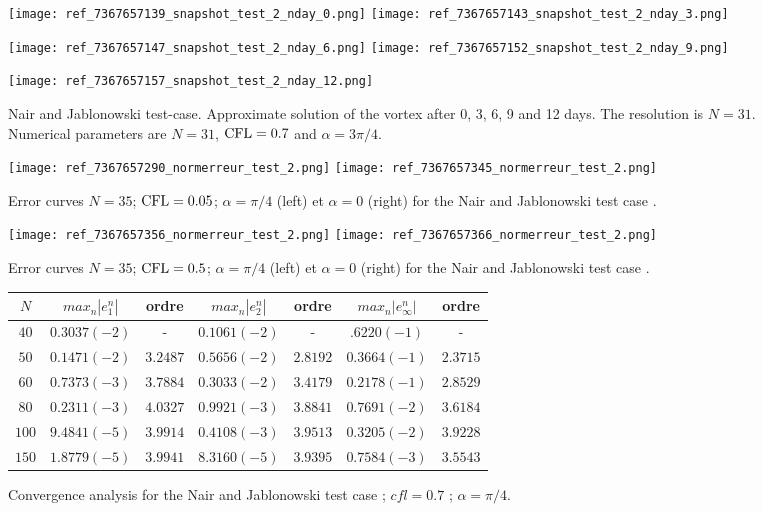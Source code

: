 \begin{figure}[!ht]
\texttt{[image: ref\_7367657139\_snapshot\_test\_2\_nday\_0.png]}
\texttt{[image: ref\_7367657143\_snapshot\_test\_2\_nday\_3.png]}

\texttt{[image: ref\_7367657147\_snapshot\_test\_2\_nday\_6.png]}
\texttt{[image: ref\_7367657152\_snapshot\_test\_2\_nday\_9.png]}

\texttt{[image: ref\_7367657157\_snapshot\_test\_2\_nday\_12.png]}
\caption{Nair and Jablonowski test-case. Approximate solution of the vortex after 
0, 3, 6, 9 and 12 days. The resolution is $N=31$. Numerical parameters are 
$N=31$, $\mathop{\rm CFL}\nolimits = 0.7$ and $\alpha = 3 \pi / 4$.}
\label{SNAPSHOT}
\end{figure}
\begin{figure}[!ht]
\texttt{[image: ref\_7367657290\_normerreur\_test\_2.png]}
\texttt{[image: ref\_7367657345\_normerreur\_test\_2.png]}
\label{erreur_cfl=0.05a}
\caption{Error curves $N=35$; $\mathop{\rm CFL}\nolimits=0.05$; $\alpha = \pi / 4$ (left) et $\alpha = 0$ (right) for the Nair and Jablonowski test case \cite{Nair-Jablonowski}.}
\end{figure}
\begin{figure}[!ht]
\texttt{[image: ref\_7367657356\_normerreur\_test\_2.png]}
\texttt{[image: ref\_7367657366\_normerreur\_test\_2.png]}
\label{erreur_cfl=0.5a}
\caption{Error curves $N=35$; $\mathop{\rm CFL}\nolimits=0.5$; $\alpha = \pi / 4$ (left) et $\alpha = 0$ (right) for the Nair and Jablonowski test case \cite{Nair-Jablonowski}.}
\end{figure}
\begin{figure}
\begin{tabular}{c||cc|cc|cc}
$N$ & $max_n |e_1^n|$ & ordre  & $max_n |e_2^n|$ & ordre  & $max_n |e_{\infty}^n|$ & ordre \\
\hline
\hline
$40$ & $0.3037 (-2)$ & -  & $0.1061(-2)$ & - & $.6220 (-1)$  & - \\
\hline 
$50$ & $0.1471 (-2)$ & $3.2487$ & $0.5656(-2)$ & $2.8192$ & $0.3664 (-1)$ & $2.3715$ \\
\hline
$60$ & $0.7373(-3)$ & $3.7884$ & $0.3033(-2)$ & $3.4179$ & $0.2178(-1)$ & $2.8529$ \\
\hline
$80$ & $0.2311(-3) $ & $4.0327$ & $0.9921(-3)$ & $3.8841$ & $0.7691(-2)$ & $3.6184$ \\
\hline
$100$ & $9.4841(-5)$ & $3.9914$ & $0.4108(-3)$ & $3.9513$ & $0.3205(-2)$ & $3.9228$\\
\hline
$150$ & $1.8779 (-5)$ & $3.9941$ & $8.3160 (-5)$ & $3.9395$ & $0.7584(-3)$ & $3.5543$
\end{tabular}
\label{table:2}
\caption{Convergence analysis for the Nair and Jablonowski test case \cite{Nair-Jablonowski} ; $cfl = 0.7$ ; $\alpha = \pi /4$.}
\end{figure}
